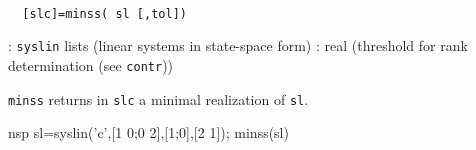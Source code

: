 \begin{mandesc}
   \\ %
\end{mandesc}
\begin{calling_sequence}
\begin{verbatim}
  [slc]=minss( sl [,tol])  
\end{verbatim}
\end{calling_sequence}
\begin{parameters}
  \begin{varlist}
    : \verb!syslin! lists (linear systems in state-space form)
    : real (threshold for rank determination (see \verb!contr!))
  \end{varlist}
\end{parameters}
\begin{mandescription}
  \verb!minss! returns in \verb!slc! a minimal realization of \verb!sl!.
\end{mandescription}
\begin{examples}
  \begin{mintednsp}{nsp}
    sl=syslin('c',[1 0;0 2],[1;0],[2 1]);
    minss(sl)
  \end{mintednsp}
\end{examples}
\begin{manseealso}
         
\end{manseealso}
